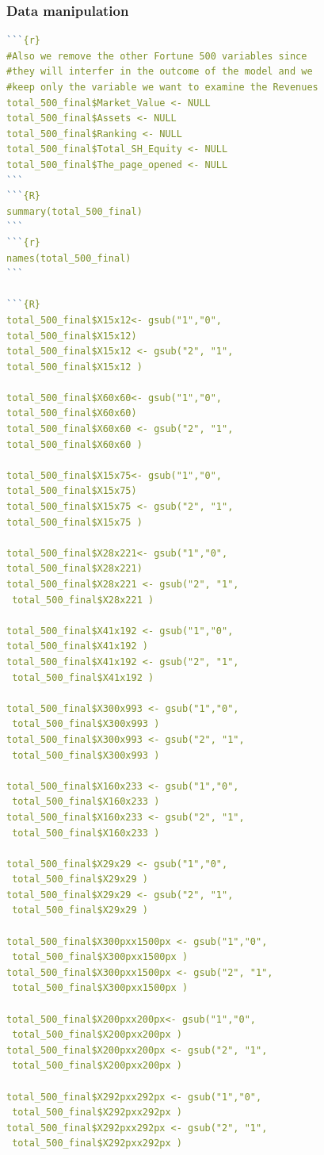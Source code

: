 \documentclass{article}
\begin{document}
\subsubsection{Data manipulation}\label{r: van: dm}
\begin{lstlisting}[language=R]
```{r}
#Also we remove the other Fortune 500 variables since 
#they will interfer in the outcome of the model and we 
#keep only the variable we want to examine the Revenues
total_500_final$Market_Value <- NULL
total_500_final$Assets <- NULL
total_500_final$Ranking <- NULL 
total_500_final$Total_SH_Equity <- NULL
total_500_final$The_page_opened <- NULL
```
```{R}
summary(total_500_final)
```
```{r}
names(total_500_final)
```

```{R}
total_500_final$X15x12<- gsub("1","0", 
total_500_final$X15x12)
total_500_final$X15x12 <- gsub("2", "1", 
total_500_final$X15x12 )

total_500_final$X60x60<- gsub("1","0", 
total_500_final$X60x60)
total_500_final$X60x60 <- gsub("2", "1", 
total_500_final$X60x60 )

total_500_final$X15x75<- gsub("1","0", 
total_500_final$X15x75)
total_500_final$X15x75 <- gsub("2", "1", 
total_500_final$X15x75 )

total_500_final$X28x221<- gsub("1","0", 
total_500_final$X28x221)
total_500_final$X28x221 <- gsub("2", "1",
 total_500_final$X28x221 )

total_500_final$X41x192 <- gsub("1","0", 
total_500_final$X41x192 )
total_500_final$X41x192 <- gsub("2", "1",
 total_500_final$X41x192 )

total_500_final$X300x993 <- gsub("1","0",
 total_500_final$X300x993 )
total_500_final$X300x993 <- gsub("2", "1",
 total_500_final$X300x993 )

total_500_final$X160x233 <- gsub("1","0",
 total_500_final$X160x233 )
total_500_final$X160x233 <- gsub("2", "1",
 total_500_final$X160x233 )

total_500_final$X29x29 <- gsub("1","0",
 total_500_final$X29x29 )
total_500_final$X29x29 <- gsub("2", "1",
 total_500_final$X29x29 )

total_500_final$X300pxx1500px <- gsub("1","0",
 total_500_final$X300pxx1500px )
total_500_final$X300pxx1500px <- gsub("2", "1",
 total_500_final$X300pxx1500px )

total_500_final$X200pxx200px<- gsub("1","0",
 total_500_final$X200pxx200px )
total_500_final$X200pxx200px <- gsub("2", "1",
 total_500_final$X200pxx200px )

total_500_final$X292pxx292px <- gsub("1","0",
 total_500_final$X292pxx292px )
total_500_final$X292pxx292px <- gsub("2", "1",
 total_500_final$X292pxx292px )


\end{lstlisting}
\end{document}
